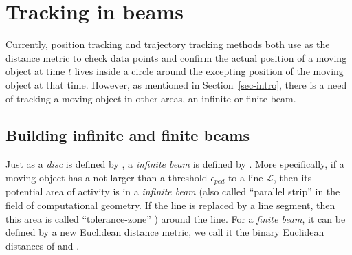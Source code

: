 

\section{Tracking in beams}
\label{sec:rectangle}
Currently, position tracking and trajectory tracking methods both use \sed as the distance metric to check data points and confirm the actual position of a moving object at time $t$ lives inside a circle around the excepting position of the moving object at that time.
{However, as mentioned in Section~\ref{sec-intro}, there is a need of tracking a moving object in other areas, \eg an infinite or finite beam.}
%

\subsection{Building infinite and finite beams}

Just as a \emph{disc} is defined by \sed, a \emph{infinite beam} is defined by \ped. More specifically, if a moving object has a \ped not larger than a threshold $\epsilon_{ped}$ to a line $\mathcal{L}$, then its potential area of activity is in a \emph{infinite beam} (also called ``parallel strip'' \cite{Chen:Space,Daescu:metric} in the field of computational geometry. If the line is replaced by a line segment, then this area is called ``tolerance-zone'' \cite{Imai:Optimal}) around the line.
For a \emph{finite beam}, it can be defined by a new Euclidean distance metric, we call it the binary Euclidean distances of \sed and \ped.



